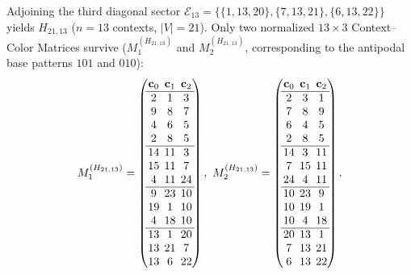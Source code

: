 \documentclass[aps,pra,reprint,superscriptaddress,longbibliography,nofootinbib,floatfix,10pt]{revtex4-2}
\theoremstyle{definition}\newtheorem{definition}[theorem]{Definition}
\theoremstyle{remark}\newtheorem{remark}[theorem]{Remark}
\begin{document}
Adjoining the third diagonal sector $\mathcal{E}_{13}=\{\{1,13,20\},\{7,13,21\},\{6,13,22\}\}$ yields $H_{21,13}$ ($n=13$ contexts, $|V|=21$). Only two normalized $13\times 3$ Context--Color Matrices survive ($M_1^{(H_{21,13})}$ and $M_2^{(H_{21,13})}$, corresponding to the antipodal base patterns $101$ and $010$):
\begin{equation}\label{eq:H21-matrices}
\setlength{\arraycolsep}{2.2pt}
M_1^{(H_{21,13})}=\begin{pmatrix}
\mathbf{c}_0&\mathbf{c}_1&\mathbf{c}_2\\\hline
2&1&3\\
9&8&7\\
4&6&5\\
2&8&5\\\hline
14&11&3\\
15&11&7\\
4&11&24\\\hline
9&23&10\\
19&1&10\\
4&18&10\\\hline
13&1&20\\
13&21&7\\
13&6&22
\end{pmatrix},\
M_2^{(H_{21,13})}=\begin{pmatrix}
\mathbf{c}_0&\mathbf{c}_1&\mathbf{c}_2\\\hline
2&3&1\\
7&8&9\\
6&4&5\\
2&8&5\\\hline
14&3&11\\
7&15&11\\
24&4&11\\\hline
10&23&9\\
10&19&1\\
10&4&18\\\hline
20&13&1\\
7&13&21\\
6&13&22
\end{pmatrix}.
\end{equation}
\end{document}
